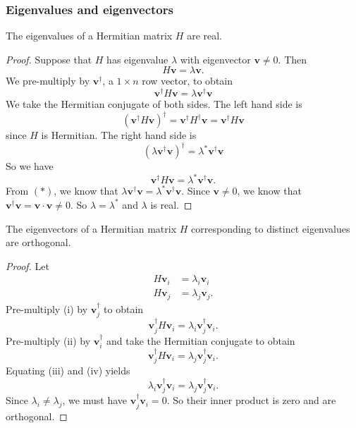 \documentclass[a4paper]{article}
\begin{document}
\subsubsection{Eigenvalues and eigenvectors}
\begin{thm}
  The eigenvalues of a Hermitian matrix $H$ are real.
\end{thm}

\begin{proof}
  Suppose that $H$ has eigenvalue $\lambda$ with eigenvector $\mathbf{v}\not= 0$. Then
  \[
    H\mathbf{v} = \lambda\mathbf{v}.
  \]
  We pre-multiply by $\mathbf{v}^\dagger$, a $1\times n$ row vector, to obtain
  \[
  \mathbf{v}^\dagger H\mathbf{v} = \lambda \mathbf{v}^\dagger \mathbf{v}\tag{$*$}\]
  We take the Hermitian conjugate of both sides. The left hand side is
  \[
    (\mathbf{v}^\dagger H\mathbf{v})^\dagger = \mathbf{v}^\dagger H^\dagger \mathbf{v} = \mathbf{v}^\dagger H \mathbf{v}
  \]
  since $H$ is Hermitian. The right hand side is
  \[
    (\lambda\mathbf{v}^\dagger\mathbf{v})^\dagger = \lambda^* \mathbf{v}^\dagger \mathbf{v}
  \]
  So we have
  \[
    \mathbf{v}^\dagger H\mathbf{v} = \lambda^* \mathbf{v}^\dagger \mathbf{v}.
  \]
  From $(*)$, we know that $\lambda \mathbf{v}^\dagger \mathbf{v} = \lambda^* \mathbf{v}^\dagger \mathbf{v}$. Since $\mathbf{v} \not= 0$, we know that $\mathbf{v}^\dagger \mathbf{v} = \mathbf{v}\cdot \mathbf{v} \not =0$. So $\lambda = \lambda^*$ and $\lambda$ is real.
\end{proof}

\begin{thm}
  The eigenvectors of a Hermitian matrix $H$ corresponding to distinct eigenvalues are orthogonal.
\end{thm}

\begin{proof}
  Let
  \begin{align*}
    H\mathbf{v}_i &= \lambda_i\mathbf{v}_i\tag{i}\\
    H\mathbf{v}_j &= \lambda_j\mathbf{v}_j\tag{ii}.
  \end{align*}
  Pre-multiply (i) by $\mathbf{v}_j^\dagger$ to obtain
  \[
    \mathbf{v}_j^\dagger H\mathbf{v}_i = \lambda_i \mathbf{v}_j^\dagger \mathbf{v}_i\tag{iii}.
  \]
  Pre-multiply (ii) by $\mathbf{v}_i^\dagger$ and take the Hermitian conjugate to obtain
  \[
    \mathbf{v}_j^\dagger H\mathbf{v}_i = \lambda_j \mathbf{v}_j^\dagger \mathbf{v}_i\tag{iv}.
  \]
  Equating (iii) and (iv) yields
  \[
    \lambda_i \mathbf{v}_j^\dagger \mathbf{v}_i = \lambda_j \mathbf{v}_j^\dagger \mathbf{v}_i.
  \]
  Since $\lambda_i\not= \lambda_j$, we must have $\mathbf{v}_j^\dagger\mathbf{v}_i = 0$. So their inner product is zero and are orthogonal.
\end{proof}
\end{document}
